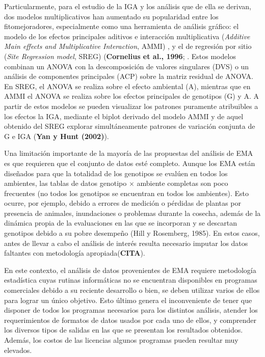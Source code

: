 Particularmente, para el estudio de la IGA y los análisis que de ella se derivan, dos modelos multiplicativos han aumentado su popularidad entre los fitomejoradores, especialmente como una herramienta de análisis gráfico: el modelo de los efectos principales aditivos e interacción multiplicativa (\emph{Additive Main effects and Multiplicative Interaction}, AMMI) \citep{Kempton1984,Gauch1988} , y el de regresión por sitio (\emph{Site Regression model}, SREG) (\textbf{Cornelius et al., 1996}; \citep{GauchZobel1997}.  Estos modelos combinan un ANOVA con la descomposición de valores singulares (DVS) o un análisis de componentes principales (ACP) sobre la matriz residual de ANOVA. En SREG, el ANOVA se realiza sobre el efecto ambiental (A),  mientras que en AMMI el ANOVA se realiza sobre los efectos principales de genotipos (G) y A. A partir de estos modelos se pueden visualizar los patrones puramente atribuibles a los efectos la IGA, mediante el biplot derivado del modelo AMMI y de aquel obtenido del SREG explorar simultáneamente patrones de variación conjunta de G e IGA (\textbf{Yan y Hunt (2002)}). 

Una limitación importante de la mayoría de las propuestas del análisis de EMA es que requieren que el conjunto de datos esté completo. Aunque los EMA están diseñados para que la totalidad de los genotipos se evalúen en todos los ambientes,  las tablas de datos genotipo $\times$ ambiente completas son poco frecuentes (no todos los genotipos se encuentran en todos los ambientes). Esto ocurre, por ejemplo, debido a errores de medición o pérdidas de plantas por presencia de animales, inundaciones o problemas durante la cosecha, además de la dinámica propia de la evaluaciones en las que se incorporan y se descartan genotipos debido a su pobre desempeño (Hill y Rosemberg, 1985). En estos casos, antes de llevar a cabo el análisis de interés resulta necesario imputar los datos faltantes con metodología apropiada(\textbf{CITA}). 


En este contexto, el análisis de datos provenientes de EMA requiere metodología estadística cuyas rutinas informáticas no se encuentran disponibles en programas comerciales debido a su reciente desarrollo o bien, se deben utilizar varios de ellos para lograr un único objetivo. Esto último genera el inconveniente de tener que disponer de todos los programas necesarios para los distintos análisis, atender los requerimientos de formatos de datos usados por cada uno de ellos, y comprender los diversos tipos de salidas en las que se presentan los resultados obtenidos. Además, los costos de las licencias algunos programas pueden resultar muy elevados. 

